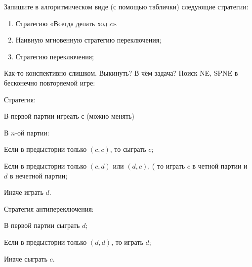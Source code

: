 \begin{problem}

Запишите в алгоритмическом виде (с помощью таблички) следующие стратегии:
\begin{enumerate}
\item  Стратегию «Всегда делать ход  $c$».\par
\item Наивную мгновенную стратегию переключения;\par
\item  Стратегию переключения;
\end{enumerate}


\begin{sol}

\end{sol}
\end{problem}



\begin{problem}
{\red Как-то конспективно слишком. Выкинуть? В чём задача?}
 Поиск NE, SPNE в бесконечно повторяемой игре: \par
Стратегия: \par
В первой партии игреать с (можно менять) \par
В $n$-ой партии:\par
Если в предыстории только $(c,c)$, то сыграть $c$; \par
Если в предыстории только $(c,d)$ или $(d,c)$, ( то играть $c$ в
четной партии и
$d$ в нечетной партии; \par
Иначе играть $d$. \par

Стратегия антипереключения: \par
В первой партии сыграть $d$; \par
Если в предыстории только $(d,d)$, то играть $d$; \par
Иначе сыграть $c$.



\begin{sol}

\end{sol}
\end{problem}



